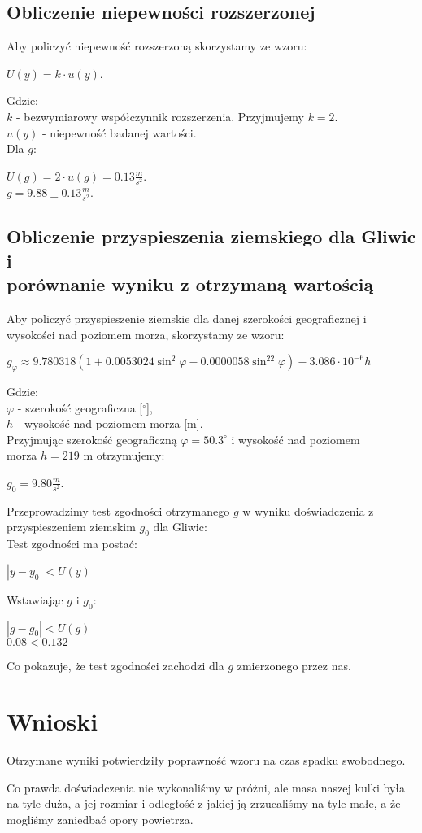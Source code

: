 \documentclass[12pt]{article}
\begin{document}
\subsection*{Obliczenie niepewności rozszerzonej}
Aby policzyć niepewność rozszerzoną skorzystamy ze wzoru:
\begin{center}
    $U(y) = k \cdot u(y)$.
\end{center}
Gdzie: \\
\indent $k$ - bezwymiarowy współczynnik rozszerzenia. Przyjmujemy $k=2$. \\
\indent $u(y)$ - niepewność badanej wartości. \\
Dla $g$:
\begin{center}
    $U(g) = 2 \cdot u(g) = 0.13 \frac{m}{s^2}$. \\
    $g = 9.88 \pm 0.13 \frac{m}{s^2}$.
\end{center}
\subsection*{Obliczenie przyspieszenia ziemskiego dla Gliwic i \\
    porównanie wyniku z otrzymaną wartością}

Aby policzyć przyspieszenie ziemskie dla danej szerokości geograficznej i
wysokości nad poziomem morza, skorzystamy ze wzoru:
\begin{center}
    $g_{\varphi} \approx 9.780318(1+0.0053024\sin^2\varphi -
        0.0000058\sin^22\varphi)-3.086 \cdot 10^{-6}h$
\end{center}
Gdzie: \\
\indent $\varphi$ - szerokość geograficzna [$^{\circ}$], \\
\indent $h$ - wysokość nad poziomem morza [m]. \\
Przyjmując szerokość geograficzną $\varphi = 50.3^{\circ}$ i wysokość nad
poziomem \\
morza $h = 219$ m otrzymujemy:
\begin{center}
    $g_0 = 9.80 \frac{m}{s^2}$.
\end{center}
Przeprowadzimy test zgodności otrzymanego $g$ w wyniku doświadczenia z
przyspieszeniem ziemskim $g_0$ dla Gliwic: \\
Test zgodności ma postać:
\begin{center}
    $|y - y_0| < U(y)$ \\
\end{center}
Wstawiając $g$ i $g_0$:
\begin{center}
    $|g - g_0| < U(g)$ \\
    $ 0.08 < 0.132 $
\end{center}
Co pokazuje, że test zgodności zachodzi dla $g$ zmierzonego przez nas.

\section{Wnioski}

Otrzymane wyniki potwierdziły poprawność wzoru na czas spadku swobodnego.

Co prawda doświadczenia nie wykonaliśmy w próżni, ale masa naszej kulki była na
tyle duża, a jej rozmiar i odległość z jakiej ją zrzucaliśmy na tyle małe, a że
mogliśmy zaniedbać opory powietrza.
\end{document}
